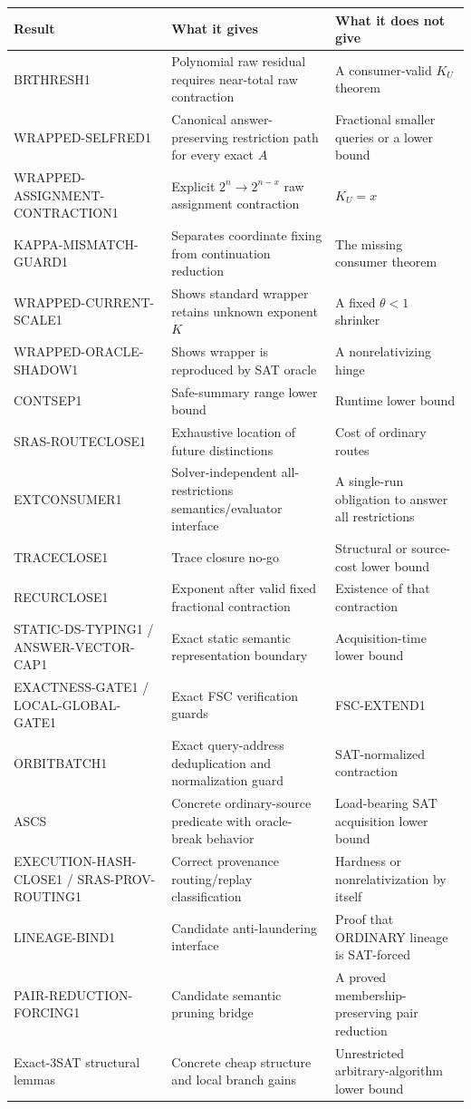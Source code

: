 \documentclass[11pt]{article}
\theoremstyle{plain}
\theoremstyle{definition}
\theoremstyle{remark}
\begin{document}
\begin{longtable}{p{} p{} p{}}
\toprule
\textbf{Result} & \textbf{What it gives} & \textbf{What it does not give}\\
\midrule
\endhead
BRTHRESH1 & Polynomial raw residual requires near-total raw contraction & A consumer-valid \(K_U\) theorem\\
WRAPPED-SELFRED1 & Canonical answer-preserving restriction path for every exact \(A\) & Fractional smaller queries or a lower bound\\
WRAPPED-ASSIGNMENT-CONTRACTION1 & Explicit \(2^n\to2^{n-x}\) raw assignment contraction & \(K_U=x\)\\
KAPPA-MISMATCH-GUARD1 & Separates coordinate fixing from continuation reduction & The missing consumer theorem\\
WRAPPED-CURRENT-SCALE1 & Shows standard wrapper retains unknown exponent \(K\) & A fixed \(\theta<1\) shrinker\\
WRAPPED-ORACLE-SHADOW1 & Shows wrapper is reproduced by SAT oracle & A nonrelativizing hinge\\
CONTSEP1 & Safe-summary range lower bound & Runtime lower bound\\
SRAS-ROUTECLOSE1 & Exhaustive location of future distinctions & Cost of ordinary routes\\
EXTCONSUMER1 & Solver-independent all-restrictions semantics/evaluator interface & A single-run obligation to answer all restrictions\\
TRACECLOSE1 & Trace closure no-go & Structural or source-cost lower bound\\
RECURCLOSE1 & Exponent after valid fixed fractional contraction & Existence of that contraction\\
STATIC-DS-TYPING1 / ANSWER-VECTOR-CAP1 & Exact static semantic representation boundary & Acquisition-time lower bound\\
EXACTNESS-GATE1 / LOCAL-GLOBAL-GATE1 & Exact FSC verification guards & FSC-EXTEND1\\
ORBITBATCH1 & Exact query-address deduplication and normalization guard & SAT-normalized contraction\\
ASCS & Concrete ordinary-source predicate with oracle-break behavior & Load-bearing SAT acquisition lower bound\\
EXECUTION-HASH-CLOSE1 / SRAS-PROV-ROUTING1 & Correct provenance routing/replay classification & Hardness or nonrelativization by itself\\
LINEAGE-BIND1 & Candidate anti-laundering interface & Proof that ORDINARY lineage is SAT-forced\\
PAIR-REDUCTION-FORCING1 & Candidate semantic pruning bridge & A proved membership-preserving pair reduction\\
Exact-3SAT structural lemmas & Concrete cheap structure and local branch gains & Unrestricted arbitrary-algorithm lower bound\\
\bottomrule
\end{longtable}
\end{document}
